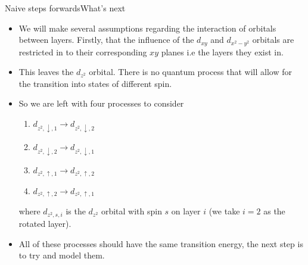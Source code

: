 \documentclass[9pt]{beamer}
\begin{document}
\begin{frame}{Naive steps forwards}{What's next}
  \begin{itemize}
    \item We will make several assumptions regarding the interaction of orbitals between layers. Firstly, that the influence of the $d_{xy}$ and $d_{x^2-y^2}$ orbitals are restricted in to their corresponding $xy$ planes i.e the layers they exist in.

    \item This leaves the $d_{z^2}$ orbital. There is no quantum process that will allow for the transition into states of different spin.

    \item{So we are left with four processes to consider

      \begin{enumerate}
        \item $d_{z^2, \downarrow, 1} \rightarrow d_{z^2, \downarrow, 2}$
        \item $d_{z^2, \downarrow, 2} \rightarrow d_{z^2, \downarrow, 1}$
        \item $d_{z^2, \uparrow, 1} \rightarrow d_{z^2, \uparrow, 2}$
        \item $d_{z^2, \uparrow, 2} \rightarrow d_{z^2, \uparrow, 1}$
      \end{enumerate}

      where $d_{z^2, s, i}$ is the $d_{z^2}$ orbital with spin $s$ on layer $i$ (we take $i=2$ as the rotated layer).
      }

    \item All of these processes should have the same transition energy, the next step is to try and model them.
  \end{itemize}
\end{frame}
\end{document}
